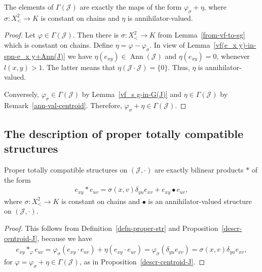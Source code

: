 \documentclass{jonasart}
\newcommand{\bl}{\bullet}
\newcommand{\dl}{\delta}
\newcommand{\G}{\Gamma}
\newcommand{\J}{\mathcal{J}}
\newcommand{\sg}{\sigma}
\newcommand{\vf}{\varphi}
\DeclareMathOperator{\Ann}{Ann}
\begin{document}
	\begin{proposition}\label{descr-centroid-J}
		The elements of $\G(\J)$ are exactly the maps of the form $\vf_\sg+\eta$, where $\sg:X^2_<\to K$ is constant on chains and $\eta$ is annihilator-valued.
	\end{proposition}

	\begin{proof}
		Let $\vf\in\G(\J)$. Then there is $\sg:X^2_<\to K$ from Lemma~\ref{from-vf-to-sg} which is constant on chains. Define $\eta=\vf-\vf_\sg$. In view of Lemma~\ref{vf(e_x y)-in-spn-e_x y+Ann(J)} we have $\eta(e_{xy})\in\Ann(\J)$ and $\eta(e_{xy})=0$, whenever $l(x,y)>1$. The latter means that $\eta(\J\cdot \J)=\{0\}$. Thus, $\eta$ is annihilator-valued.

		Conversely, $\vf_\sg\in\G(\J)$ by Lemma~\ref{vf_s g-in-G(J)} and $\eta\in\G(\J)$ by Remark~\ref{ann-val-centroid}. Therefore, $\vf_\sg+\eta\in\G(\J)$.
	\end{proof}

	\subsection{The description of proper totally compatible structures}
	\begin{corollary}\label{proper-tot-comp-explicit}
		Proper totally compatible structures on $(\J,\cdot)$ are exactly bilinear products $*$ of the form
		\begin{align}\label{e_x y*e_u v-proper}
			e_{xy}*e_{uv}=\sg(x,v)\dl_{yu}e_{xv}+e_{xy}\bl e_{uv},
		\end{align}
		where $\sg:X^2_<\to K$ is constant on chains and $\bl$ is an annihilator-valued structure on $(\J,\cdot)$.
	\end{corollary}

	\begin{proof}
		This follows from Definition~\ref{defn-proper-str} and Proposition~\ref{descr-centroid-J}, because we have
		\begin{align*}
			e_{xy}*_\vf e_{uv}=\vf_\sg(e_{xy}\cdot e_{uv})+\eta(e_{xy}\cdot e_{uv})=\vf_\sg(\dl_{yu}e_{xv})=\sg(x,v)\dl_{yu}e_{xv},
		\end{align*}
        for $\vf=\vf_\sg+\eta\in\G(\J)$, as in Proposition~\ref{descr-centroid-J}.
	\end{proof}
\end{document}
